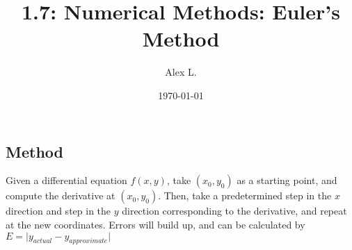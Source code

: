 \documentclass{article}
\title{1.7: Numerical Methods: Euler's Method}
\author{Alex L.}
\date{\today}
\begin{document}
\maketitle

\subsection{Method}

Given a differential equation $f(x,y)$, take $(x_0,y_0)$ as a starting point, and compute the derivative at $(x_0,y_0)$. Then, take a predetermined step in the $x$ direction and step in the $y$ direction corresponding to the derivative, and repeat at the new coordinates. Errors will build up, and can be calculated by $E = \vert y_{actual} - y_{approximate}\vert$
\end{document}
